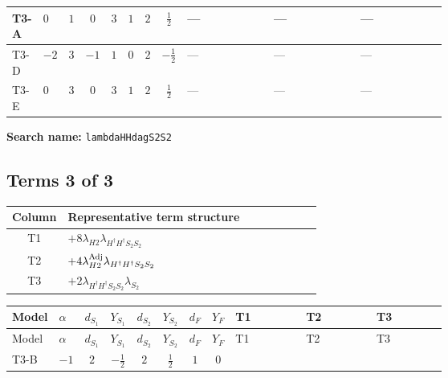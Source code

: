 \documentclass[8pt]{article}
\begin{document}
\begin{landscape}
\begin{longtable}{@{}llcccccc >{\raggedright\arraybackslash}p{0.21\linewidth} >{\raggedright\arraybackslash}p{0.21\linewidth} >{\raggedright\arraybackslash}p{0.21\linewidth}@{}}
\midrule
T3-A & $0$ & $1$ & $0$ & $3$ & $1$ & $2$ & $\frac{1}{2}$ & --- & --- & --- \\
\midrule
T3-D & $-2$ & $3$ & $-1$ & $1$ & $0$ & $2$ & $-\frac{1}{2}$ & --- & --- & --- \\
\midrule
T3-E & $0$ & $3$ & $0$ & $3$ & $1$ & $2$ & $\frac{1}{2}$ & --- & --- & --- \\
\midrule
\bottomrule
\end{longtable}
\clearpage
\noindent\textbf{Search name: }\texttt{lambdaHHdagS2S2}\par\smallskip
\subsection*{Terms 3 of 3}
\begin{center}
\begin{tabular}{@{}c >{\raggedright\arraybackslash}p{0.82\linewidth}@{}}
\toprule
Column & Representative term structure \\
\midrule
T1 & \(\displaystyle +8 {\lambda_{H2}} {\lambda_{H^\dagger H^\dagger S_2 S_2}}\) \\
\midrule
T2 & \(\displaystyle +4 {\lambda_{H2}^{\rm Adj}} {\lambda_{H^\dagger H^\dagger S_2 S_2}}\) \\
\midrule
T3 & \(\displaystyle +2 {\lambda_{H^\dagger H^\dagger S_2 S_2}} {\lambda_{S_2}}\) \\
\midrule
\bottomrule
\end{tabular}
\end{center}
\smallskip
\tiny
\begin{longtable}{@{}llcccccc >{\raggedright\arraybackslash}p{0.21\linewidth} >{\raggedright\arraybackslash}p{0.21\linewidth} >{\raggedright\arraybackslash}p{0.21\linewidth}@{}}
\toprule
Model & $\alpha$ & $d_{S_1}$ & $Y_{S_1}$ & $d_{S_2}$ & $Y_{S_2}$ & $d_F$ & $Y_F$ & T1 & T2 & T3 \\
\midrule
\endfirsthead
\toprule
Model & $\alpha$ & $d_{S_1}$ & $Y_{S_1}$ & $d_{S_2}$ & $Y_{S_2}$ & $d_F$ & $Y_F$ & T1 & T2 & T3 \\
\midrule
\endhead
T3-B & $-1$ & $2$ & $-\frac{1}{2}$ & $2$ & $\frac{1}{2}$ & $1$ & $0$ & \scriptsize\adjustbox{max width=\linewidth}{$\begin{gathered} +8 {\lambda_{H2}} {\lambda_{H^\dagger H^\dagger S_2 S_2}}\end{gathered}$} & \scriptsize\adjustbox{max width=\linewidth}{$\begin{gathered} +4 {\lambda_{H2}^{\rm Adj}} {\lambda_{H^\dagger H^\dagger S_2 S_2}}\end{gathered}$} & \scriptsize\adjustbox{max width=\linewidth}{$\begin{gathered} +2 {\lambda_{H^\dagger H^\dagger S_2 S_2}} {\lambda_{S_2}}\end{gathered}$} \\

\end{longtable}
\end{landscape}
\end{document}
